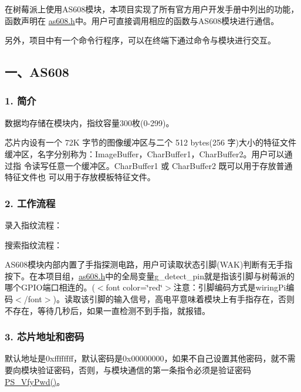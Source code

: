 在树莓派上使用\+A\+S608模块，本项目实现了所有官方用户开发手册中列出的功能，函数声明在 {\ttfamily \hyperlink{as608_8h}{as608.\+h}}中。用户可直接调用相应的函数与\+A\+S608模块进行通信。

另外，项目中有一个命令行程序，可以在终端下通过命令与模块进行交互。

\subsection*{一、\+A\+S608}

\subsubsection*{1. 简介}

数据均存储在模块内，指纹容量300枚(0-\/299)。

芯片内设有一个 72\+K 字节的图像缓冲区与二个 512 bytes(256 字)大小的特征文件 缓冲区，名字分别称为：{\ttfamily Image\+Buffer}，{\ttfamily Char\+Buffer1}，{\ttfamily Char\+Buffer2}。用户可以通过指 令读写任意一个缓冲区。{\ttfamily Char\+Buffer1} 或 {\ttfamily Char\+Buffer2} 既可以用于存放普通特征文件也 可以用于存放模板特征文件。

\subsubsection*{2. 工作流程}

录入指纹流程：



搜索指纹流程：



A\+S608模块内部内置了手指探测电路，用户可读取状态引脚(\+W\+A\+K)判断有无手指按下。在本项目组，{\ttfamily \hyperlink{as608_8h}{as608.\+h}}中的全局变量{\ttfamily g\+\_\+detect\+\_\+pin}就是指该引脚与树莓派的哪个\+G\+P\+I\+O端口相连的。($<$font color=\char`\"{}red\char`\"{}$>$注意：引脚编码方式是{\ttfamily wiring\+Pi}编码$<$/font$>$)。读取该引脚的输入信号，高电平意味着模块上有手指存在，否则不存在，等待几秒后，如果一直检测不到手指，就报错。

\subsubsection*{3. 芯片地址和密码}

默认地址是{\ttfamily 0xffffffff}，默认密码是{\ttfamily 0x00000000}，如果不自己设置其他密码，就不需要向模块验证密码，否则，与模块通信的第一条指令必须是验证密码{\ttfamily \hyperlink{as608_8c_a45a9810f3281670bff70b96a150f5c09}{P\+S\+\_\+\+Vfy\+Pwd()}}。

